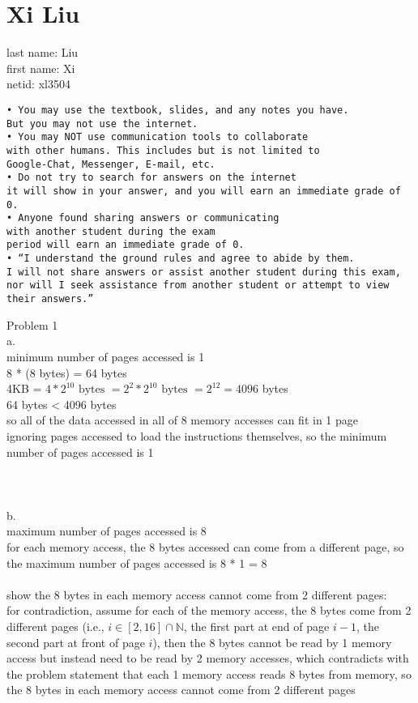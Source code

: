 \documentclass[12pt, border = 4pt, multi]{article} %
\begin{document}
\section*{Xi Liu}
last name: Liu\\
first name: Xi\\
netid: xl3504\\
\begin{verbatim}
• You may use the textbook, slides, and any notes you have.
But you may not use the internet.
• You may NOT use communication tools to collaborate 
with other humans. This includes but is not limited to
Google-Chat, Messenger, E-mail, etc.
• Do not try to search for answers on the internet
it will show in your answer, and you will earn an immediate grade of 0.
• Anyone found sharing answers or communicating
with another student during the exam
period will earn an immediate grade of 0.
• “I understand the ground rules and agree to abide by them.
I will not share answers or assist another student during this exam,
nor will I seek assistance from another student or attempt to view their answers.”
\end{verbatim}
\newpage
\noindent
Problem 1\\
a.\\
minimum number of pages accessed is 1\\
8 * (8 bytes) = 64 bytes\\
4KB = $4 * 2 ^ {10} \text{ bytes } = 2 ^ 2 * 2 ^ {10} \text{ bytes } = 2 ^ {12} = 4096$ bytes\\
64 bytes < 4096 bytes\\
so all of the data accessed in all of 8 memory accesses can fit in 1 page\\
ignoring pages accessed to load the instructions themselves, so the minimum number of pages accessed is 1\\
\\
\\
\\
b.\\
maximum number of pages accessed is 8\\
for each memory access, the 8 bytes accessed can come from a different page, so the maximum number of pages accessed is 8 * 1 = 8\\
\\
show the 8 bytes in each memory access cannot come from 2 different pages:\\
for contradiction, assume for each of the memory access, the 8 bytes come from 2 different pages (i.e., $i \in [2, 16] \cap \mathbb{N}$, the first part at end of page $i - 1$, the second part at front of page $i$), then the 8 bytes cannot be read by 1 memory access but instead need to be read by 2 memory accesses, which contradicts with the problem statement that each 1 memory access reads 8 bytes from memory, so the 8 bytes in each memory access cannot come from 2 different pages\\
\end{document}

